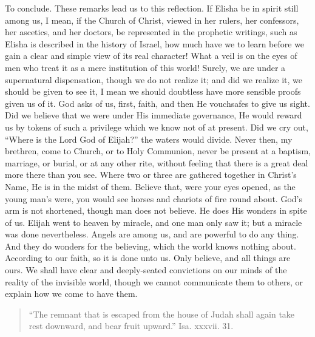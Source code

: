 To conclude. These remarks lead us to this reflection. If Elisha be
in spirit still among us, I mean, if the Church of Christ, viewed in
her rulers, her confessors, her ascetics, and her doctors, be
represented in the prophetic writings, such as Elisha is described in
the history of Israel, how much have we to learn before we gain a
clear and simple view of its real character! What a veil is on the
eyes of men who treat it as a mere institution of this world! Surely,
we are under a supernatural dispensation, though we do not realize it;
and did we realize it, we should be given to see it, I mean we should
doubtless have more sensible proofs given us of it. God asks of us,
first, faith, and then He vouchsafes to give us sight. Did we believe
that we were under His immediate governance, He would reward us by
tokens of such a privilege which we know not of at present. Did we cry
out, ``Where is the Lord God of Elijah?'' the waters would
divide. Never then, my brethren, come to Church, or to Holy Communion,
never be present at a baptism, marriage, or burial, or at any other
rite, without feeling that there is a great deal more there than you
see. Where two or three are gathered together in Christ's Name, He is
in the midst of them. Believe that, were your eyes opened, as the
young man's were, you would see horses and chariots of fire round
about. God's arm is not shortened, though man does not believe. He
does His wonders in spite of us. Elijah went to heaven by miracle, and
one man only saw it; but a miracle was done nevertheless. Angels are
among us, and are powerful to do any thing. And they do wonders for
the believing, which the world knows nothing about. According to our
faith, so it is done unto us. Only believe, and all things are ours.
We shall have clear and deeply-seated convictions on our minds of the
reality of the invisible world, though we cannot communicate them to
others, or explain how we come to have them.


\begin{quote}

``The remnant that is escaped from the house of Judah shall
again take rest downward, and bear fruit upward.'' Isa. xxxvii.
31.

\end{quote}

